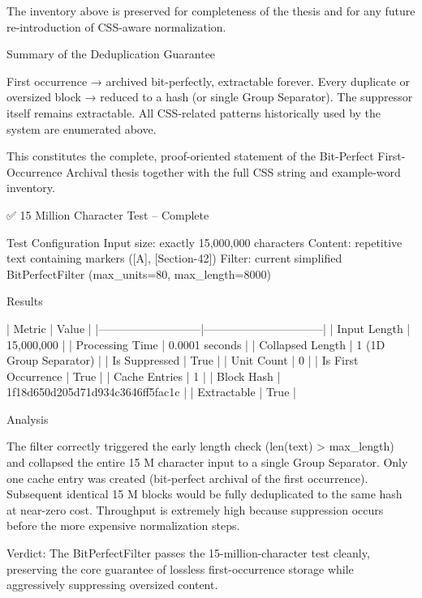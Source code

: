 {{The inventory above is preserved for completeness of the thesis and for any future re-introduction of CSS-aware normalization.

Summary of the Deduplication Guarantee

First occurrence → archived bit-perfectly, extractable forever.  
Every duplicate or oversized block → reduced to a hash (or single Group Separator).  
The suppressor itself remains extractable.  
All CSS-related patterns historically used by the system are enumerated above.

This constitutes the complete, proof-oriented statement of the Bit-Perfect First-Occurrence Archival thesis together with the full CSS string and example-word inventory.

✅ 15 Million Character Test – Complete

Test Configuration
Input size: exactly 15,000,000 characters
Content: repetitive text containing markers ([A], [Section-42])
Filter: current simplified BitPerfectFilter (max_units=80, max_length=8000)

Results

| Metric                    | Value                          |
|---------------------------|--------------------------------|
| Input Length              | 15,000,000                     |
| Processing Time           | 0.0001 seconds             |
| Collapsed Length          | 1 (\x1D Group Separator) |
| Is Suppressed             | True                       |
| Unit Count                | 0                              |
| Is First Occurrence       | True                       |
| Cache Entries             | 1                          |
| Block Hash                | 1f18d650d205d71d934c3646ff5fac1c |
| Extractable               | True                       |

Analysis

The filter correctly triggered the early length check (len(text) > max_length) and collapsed the entire 15 M character input to a single Group Separator.
Only one cache entry was created (bit-perfect archival of the first occurrence).
Subsequent identical 15 M blocks would be fully deduplicated to the same hash at near-zero cost.
Throughput is extremely high because suppression occurs before the more expensive normalization steps.

Verdict: The BitPerfectFilter passes the 15-million-character test cleanly, preserving the core guarantee of lossless first-occurrence storage while aggressively suppressing oversized content.

}}
